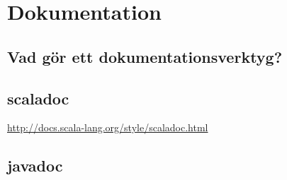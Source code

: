 
\chapter{Dokumentation}

\section{Vad gör ett dokumentationsverktyg?}

\section{scaladoc}

\url{http://docs.scala-lang.org/style/scaladoc.html}

\section{javadoc}